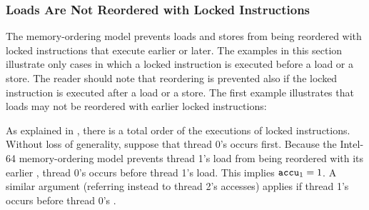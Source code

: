 \newpage

\subsubsection*{Loads Are Not Reordered with Locked Instructions}

The memory-ordering model prevents loads and stores from being reordered with locked instructions that execute earlier or later.
The examples in this section illustrate only cases in which a locked instruction is executed before a load or a store.
The reader should note that reordering is prevented also if the locked instruction is executed after a load or a store.
\bigbreak
\noindent
The first example illustrates that loads may not be reordered with earlier locked instructions:

\begin{table}[!hbt]
\noindent{}
\caption{Loads Are not Reordered with Locks \cite[Example 8-9]{ref:Intel}}
\label{tbl:litmus:intel:9}
\end{table}

\noindent
As explained in \cite[Section 8.2.3.8]{ref:Intel}, there is a total order of the executions of locked instructions.
Without loss of generality, suppose that thread 0’s  occurs first.
\bigbreak
\noindent
Because the Intel-64 memory-ordering model prevents thread 1’s load from being reordered with its earlier , thread 0’s  occurs before thread 1’s load.
This implies $\texttt{accu}_1 = 1$.
\bigbreak
\noindent
A similar argument (referring instead to thread 2’s accesses) applies if thread 1’s  occurs before thread 0’s .

